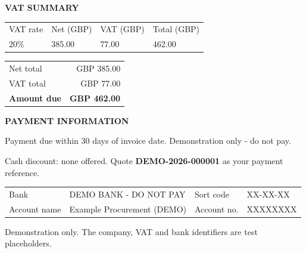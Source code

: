 \documentclass[10pt,a4paper]{article}
\begin{document}
\begin{minipage}{\textwidth}
\raggedright

{\small\bfseries VAT SUMMARY}\par
\begin{tabularx}{\textwidth}{@{}l >{\raggedleft\arraybackslash}X >{\raggedleft\arraybackslash}X >{\raggedleft\arraybackslash}X@{}}
\rowcolor{pale}\small VAT rate & \small Net (GBP) & \small VAT (GBP) & \small Total (GBP) \\

\small 20\% & \small 385.00 & \small 77.00 & \small 462.00 \\

\end{tabularx}

\vspace{3mm}
\begin{flushright}
\begin{tabular}{@{}lr@{}}
Net total & GBP 385.00 \\
VAT total & GBP 77.00 \\
\midrule
{\large\bfseries Amount due} & {\large\bfseries GBP 462.00} \\
\end{tabular}
\end{flushright}
\vspace{3mm}
{\small\bfseries PAYMENT INFORMATION}\par
{\small Payment due within 30 days of invoice date. Demonstration only - do not pay.\par
Cash discount: none offered. Quote \textbf{DEMO-2026-000001} as your payment reference.}
\vspace{2mm}
\colorbox{pale}{\parbox{\dimexpr\textwidth-2\fboxsep\relax}{\small
\begin{tabularx}{\linewidth}{@{}l X l X@{}}
Bank & DEMO BANK - DO NOT PAY & Sort code & XX-XX-XX \\
Account name & Example Procurement (DEMO) & Account no. & XXXXXXXX \\
\end{tabularx}}}

\par{\footnotesize\color{demo}Demonstration only. The company, VAT and bank identifiers are test placeholders.}

\end{minipage}
\end{document}
